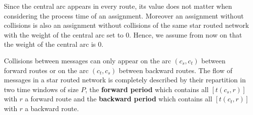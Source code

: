 \documentclass[10pt, conference, letterpaper]{IEEEtran}
\newcommand\pall{\textsc{pall}\xspace}
\begin{document}
  Since the central arc appears in every route, its value does not matter when considering the process time of an assignment.
  Moreover an assignment without collisions is also an assignment without collisions of the same star routed network with the weight of the central arc set to $0$. Hence, we assume from now on that the weight of the central arc is $0$.
      
      
  Collisions between messages can only appear on the arc $(c_s,c_t)$ between forward routes or on the arc $(c_t,c_s)$
  between backward routes. The flow of messages in a star routed network is completely described by their repartition in two time windows of size $P$, the {\bf forward period} which contains all $[t(c_s,r)]$ with $r$ a forward route and the {\bf backward period} which contains all $[t(c_t,r)]$ with $r$ a backward route.


      
\end{document}
